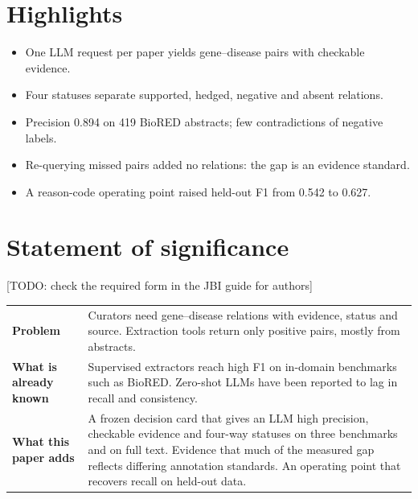 \documentclass[11pt,letterpaper]{article}
\newcommand{\todo}[1]{\textcolor{stneg}{[TODO: #1]}}
\begin{document}
\section*{Highlights}
\begin{itemize}
\item One LLM request per paper yields gene--disease pairs with checkable evidence.
\item Four statuses separate supported, hedged, negative and absent relations.
\item Precision 0.894 on 419 BioRED abstracts; few contradictions of negative labels.
\item Re-querying missed pairs added no relations: the gap is an evidence standard.
\item A reason-code operating point raised held-out F1 from 0.542 to 0.627.
\end{itemize}

\section*{Statement of significance}
\todo{check the required form in the JBI guide for authors}

\medskip
\noindent
\begin{tabularx}{\linewidth}{@{}>{\bfseries}p{3.4cm}X@{}}
\toprule
Problem & Curators need gene--disease relations with evidence, status and source. Extraction tools return only positive pairs, mostly from abstracts.\\
What is already known & Supervised extractors reach high F1 on in-domain benchmarks such as BioRED. Zero-shot LLMs have been reported to lag in recall and consistency.\\
What this paper adds & A frozen decision card that gives an LLM high precision, checkable evidence and four-way statuses on three benchmarks and on full text. Evidence that much of the measured gap reflects differing annotation standards. An operating point that recovers recall on held-out data.\\
\bottomrule
\end{tabularx}
\end{document}
